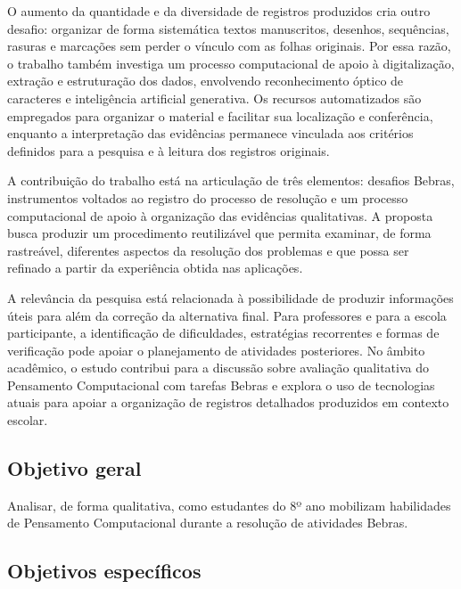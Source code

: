 O aumento da quantidade e da diversidade de registros produzidos cria outro desafio: organizar de forma sistemática textos manuscritos, desenhos, sequências, rasuras e marcações sem perder o vínculo com as folhas originais. Por essa razão, o trabalho também investiga um processo computacional de apoio à digitalização, extração e estruturação dos dados, envolvendo reconhecimento óptico de caracteres e inteligência artificial generativa. Os recursos automatizados são empregados para organizar o material e facilitar sua localização e conferência, enquanto a interpretação das evidências permanece vinculada aos critérios definidos para a pesquisa e à leitura dos registros originais.

A contribuição do trabalho está na articulação de três elementos: desafios Bebras, instrumentos voltados ao registro do processo de resolução e um processo computacional de apoio à organização das evidências qualitativas. A proposta busca produzir um procedimento reutilizável que permita examinar, de forma rastreável, diferentes aspectos da resolução dos problemas e que possa ser refinado a partir da experiência obtida nas aplicações.

A relevância da pesquisa está relacionada à possibilidade de produzir informações úteis para além da correção da alternativa final. Para professores e para a escola participante, a identificação de dificuldades, estratégias recorrentes e formas de verificação pode apoiar o planejamento de atividades posteriores. No âmbito acadêmico, o estudo contribui para a discussão sobre avaliação qualitativa do Pensamento Computacional com tarefas Bebras e explora o uso de tecnologias atuais para apoiar a organização de registros detalhados produzidos em contexto escolar.

\subsection{Objetivo geral}

Analisar, de forma qualitativa, como estudantes do 8º ano mobilizam habilidades de Pensamento Computacional durante a resolução de atividades Bebras.

\subsection{Objetivos específicos}

